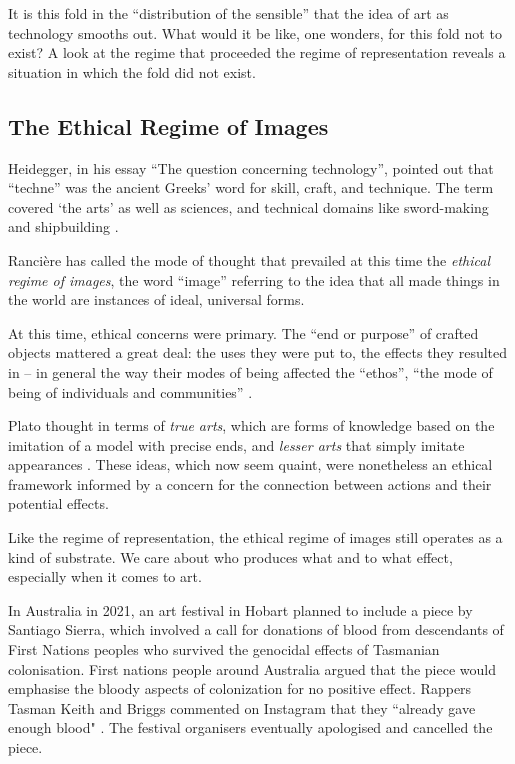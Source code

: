 \documentclass[letter:wpaper]{article}
\begin{document}
    It is this fold in the ``distribution of the sensible'' \citep[p.42]{RancierPltcsOfThAsthtcs2004} that the idea of art as technology smooths out. What would it be like, one wonders, for this fold not to exist?  A look at the regime that proceeded the regime of representation reveals a situation in which the fold did not exist.
    
    \subsection{The Ethical Regime of Images}

    Heidegger, in his essay ``The question concerning technology'', pointed out that ``techne'' was the ancient Greeks' word for skill, craft, and technique. The term covered ‘the arts’ as well as sciences, and technical domains like sword-making and shipbuilding \citep[p34]{HeideggerThQstnCncrngTchnlgy1954}.
    
    Rancière has called the mode of thought that prevailed at this time the \emph{ethical regime of images}, the word ``image'' referring to the idea that all made things in the world are instances of ideal, universal forms.

    At this time, ethical concerns were primary. The ``end or purpose'' of crafted objects mattered a great deal: the uses they were put to, the effects they resulted in -- in general the way their modes of being affected the ``ethos'', ``the mode of being of individuals and communities'' \citep[pp.20–21]{RancierPltcsOfThAsthtcs2004}.

    Plato thought in terms of \emph{true arts}, which are forms of knowledge based on the imitation of a model with precise ends, and \emph{lesser arts} that simply imitate appearances \citep[p.20]{RancierPltcsOfThAsthtcs2004}. These ideas, which now seem quaint, were nonetheless an ethical framework informed by a concern for the connection between actions and their potential effects.

    Like the regime of representation, the ethical regime of images still operates as a kind of substrate. We care about who produces what and to what effect, especially when it comes to art.
    
    In Australia in 2021, an art festival in Hobart planned to include a piece by Santiago Sierra, which involved a call for donations of blood from descendants of First Nations peoples who survived the genocidal effects of Tasmanian colonisation. First nations people around Australia argued that the piece would emphasise the bloody aspects of colonization for no positive effect. Rappers Tasman Keith and Briggs commented on Instagram that they ``already gave enough blood" \citep{DrkMfBld2021}. The festival organisers eventually apologised and cancelled the piece.
    
\end{document}
